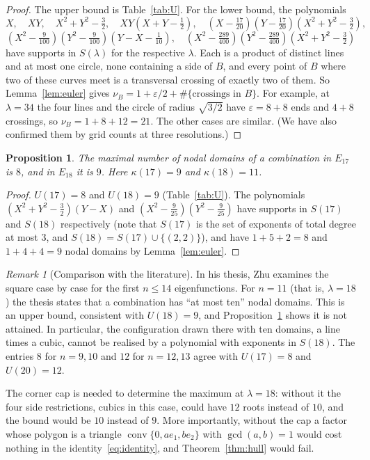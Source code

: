 \documentclass[11pt]{amsart}
\newtheorem{proposition}[theorem]{Proposition}
\theoremstyle{definition}
\theoremstyle{remark}
\newtheorem{remark}[theorem]{Remark}
\newcommand{\conv}{\operatorname{conv}}
\numberwithin{equation}{section}
\begin{document}
\begin{proof}
The upper bound is Table~\ref{tab:U}. For the lower bound, the polynomials
\[
X,\quad XY,\quad X^2+Y^2-\tfrac32,\quad XY(X+Y-\tfrac12),\quad
(X-\tfrac{17}{20})(Y-\tfrac{17}{20})(X^2+Y^2-\tfrac32),
\]
\[
(X^2-\tfrac{9}{100})(Y^2-\tfrac{9}{100})(Y-X-\tfrac1{10}),\quad
(X^2-\tfrac{289}{400})(Y^2-\tfrac{289}{400})(X^2+Y^2-\tfrac32)
\]
have supports in $S(\lambda)$ for the respective $\lambda$. Each is a product of distinct lines and at most one circle, none containing a side of $B$, and
every point of $B$ where two of these curves meet is a transversal crossing of exactly two of
them. So Lemma~\ref{lem:euler} gives $\nu_B=1+\varepsilon/2+\#\{\text{crossings in }B\}$.
For example, at $\lambda=34$ the four lines and the circle of radius $\sqrt{3/2}$ have
$\varepsilon=8+8$ ends and $4+8$ crossings, so $\nu_B=1+8+12=21$. The other cases are similar.
(We have also confirmed them by grid counts at three resolutions.)
\end{proof}

\begin{proposition}\label{prop:17-18}
The maximal number of nodal domains of a combination in $E_{17}$ is $8$, and in $E_{18}$ it
is $9$. Here $\kappa(17)=9$ and $\kappa(18)=11$.
\end{proposition}

\begin{proof}
$U(17)=8$ and $U(18)=9$ (Table~\ref{tab:U}). The polynomials $(X^2+Y^2-\tfrac32)(Y-X)$ and
$(X^2-\tfrac9{25})(Y^2-\tfrac9{25})$ have supports in $S(17)$ and $S(18)$ respectively (note that
$S(17)$ is the set of exponents of total degree at most $3$, and $S(18)=S(17)\cup\{(2,2)\}$),
and have $1+5+2=8$ and $1+4+4=9$ nodal domains by Lemma~\ref{lem:euler}.
\end{proof}

\begin{remark}[Comparison with the literature]
In his thesis, Zhu \cite[\S4.4.1]{ZhuThesis} examines the square case by case for the first
$n\le14$ eigenfunctions. For $n=11$ (that is, $\lambda=18$) the thesis states that a combination
has ``at most ten'' nodal domains. This is an upper bound, consistent with $U(18)=9$, and
Proposition~\ref{prop:17-18} shows it is not attained. In particular, the configuration drawn there with ten
domains, a line times a cubic, cannot be realised by a polynomial with exponents in $S(18)$. The entries $8$ for $n=9,10$ and $12$ for $n=12,13$ agree with $U(17)=8$ and
$U(20)=12$.

The corner cap is needed to determine the maximum at $\lambda=18$: without it the four side
restrictions, cubics in this case, could have $12$ roots instead of $10$, and the bound
would be $10$ instead of $9$. More importantly, without the cap a factor whose polygon is a
triangle $\conv\{0,ae_1,be_2\}$ with $\gcd(a,b)=1$ would cost nothing in the
identity~\eqref{eq:identity}, and
Theorem~\ref{thm:hull} would fail.
\end{remark}
\end{document}
